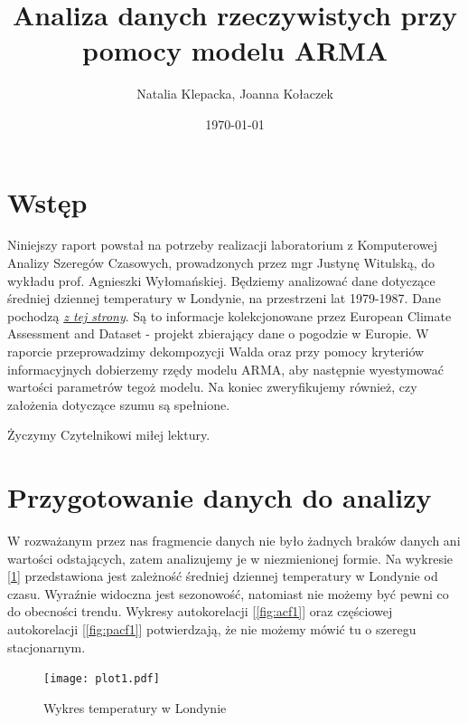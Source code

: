 \documentclass{article}
\title{Analiza danych rzeczywistych przy pomocy modelu ARMA}
\author{Natalia Klepacka, Joanna Kołaczek}
\date{\today}
\theoremstyle{break}
\begin{document}
	\maketitle
	\tableofcontents
	\clearpage
	\section{Wstęp}
	Niniejszy raport powstał na potrzeby realizacji laboratorium z Komputerowej Analizy Szeregów Czasowych, prowadzonych przez mgr Justynę Witulską, do wykładu prof. Agnieszki Wyłomańskiej.
	Będziemy analizować dane dotyczące średniej dziennej temperatury w Londynie, na przestrzeni lat 1979-1987. Dane pochodzą \href{https://www.kaggle.com/datasets/emmanuelfwerr/london-weather-data }{\textit{z tej strony}}. Są to informacje kolekcjonowane przez European Climate Assessment and Dataset - projekt zbierający dane o pogodzie w Europie.
	W raporcie przeprowadzimy dekompozycji Walda oraz przy pomocy kryteriów informacyjnych dobierzemy rzędy modelu ARMA, aby następnie wyestymować wartości parametrów tegoż modelu. Na koniec zweryfikujemy również, czy założenia dotyczące szumu są spełnione.
	
	Życzymy Czytelnikowi miłej lektury.
	
	\section{Przygotowanie danych do analizy}
	W rozważanym przez nas fragmencie danych nie było żadnych braków danych ani wartości odstających, zatem analizujemy je w niezmienionej formie. Na wykresie [\ref{fig:p1}] przedstawiona jest zależność średniej dziennej temperatury w Londynie od czasu. Wyraźnie widoczna jest sezonowość, natomiast nie możemy być pewni co do obecności trendu. Wykresy autokorelacji [\ref{fig:acf1}] oraz częściowej autokorelacji [\ref{fig:pacf1}] potwierdzają, że nie możemy mówić tu o szeregu stacjonarnym.
	
	\begin{figure}[H]
		\begin{center}
			\texttt{[image: plot1.pdf]}
			\caption{Wykres temperatury w Londynie}
			\label{fig:p1}
		\end{center}
	\end{figure}
	
\end{document}

